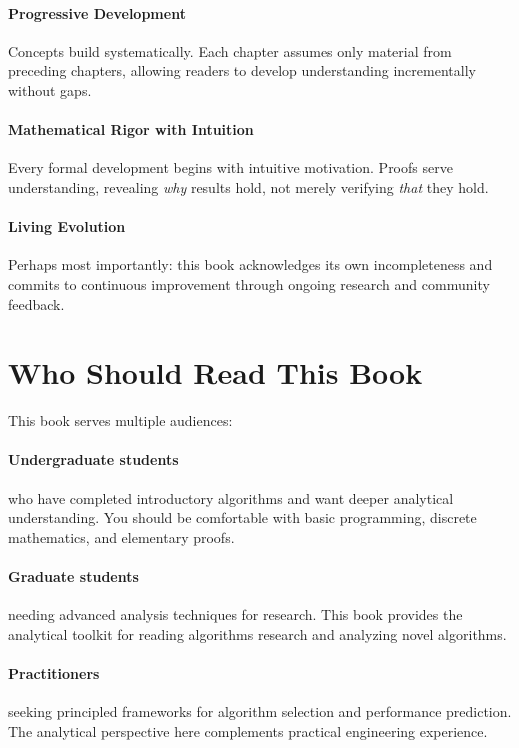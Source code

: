 \paragraph{Progressive Development}
Concepts build systematically. Each chapter assumes only material from preceding chapters, allowing readers to develop understanding incrementally without gaps.

\paragraph{Mathematical Rigor with Intuition}
Every formal development begins with intuitive motivation. Proofs serve understanding, revealing \textit{why} results hold, not merely verifying \textit{that} they hold.

\paragraph{Living Evolution}
Perhaps most importantly: this book acknowledges its own incompleteness and commits to continuous improvement through ongoing research and community feedback.


\section*{Who Should Read This Book}

This book serves multiple audiences:

\paragraph{Undergraduate students} who have completed introductory algorithms and want deeper analytical understanding. You should be comfortable with basic programming, discrete mathematics, and elementary proofs.

\paragraph{Graduate students} needing advanced analysis techniques for research. This book provides the analytical toolkit for reading algorithms research and analyzing novel algorithms.

\paragraph{Practitioners} seeking principled frameworks for algorithm selection and performance prediction. The analytical perspective here complements practical engineering experience.

